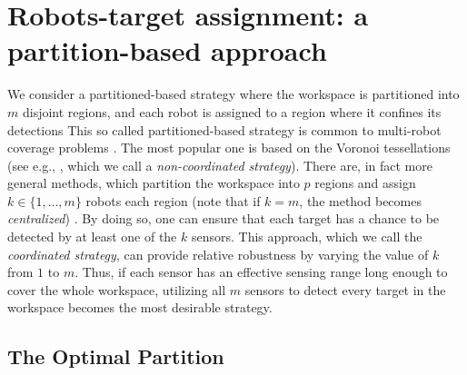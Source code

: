 \documentclass[letterpaper, 10 pt, conference]{ieeeconf}
\newcommand{\Ram}[1]{{\normalsize{\textbf{({\color{green}Ram:\ }#1)}}}}
\begin{document}
\section{Robots-target assignment: a partition-based approach}
\label{sec:sec4}
We consider a partitioned-based strategy where the workspace is partitioned into $m$ disjoint regions, and each robot is assigned to a region where it confines its detections 
This so called partitioned-based strategy is common to multi-robot coverage problems \cite{cortes_coverage_2004,hutchinson_robust_2012,schwager2009decentralized,park2014robust}. 
The most popular one is based on the Voronoi tessellations (see e.g., \cite{cortes_coverage_2004}, which we call a \emph{non-coordinated strategy}).
There are, in fact more general methods, which partition the workspace into $p$ regions and assign $k \in \lbrace 1,\dots,m \rbrace$ robots each region (note that if $k=m$, the method becomes \emph{centralized}) \cite{hutchinson_robust_2012}. 
By doing so, one can ensure that each target has a chance to be detected by at least one of the $k$ sensors.
This approach, which we call the \emph{coordinated strategy}, can provide relative robustness by varying the value of $k$ from $1$ to $m$.
Thus, if each sensor has an effective sensing range long enough to cover the whole workspace, utilizing all $m$ sensors to detect every target in the workspace becomes the most desirable strategy.

\subsection{The Optimal Partition}
\end{document}
